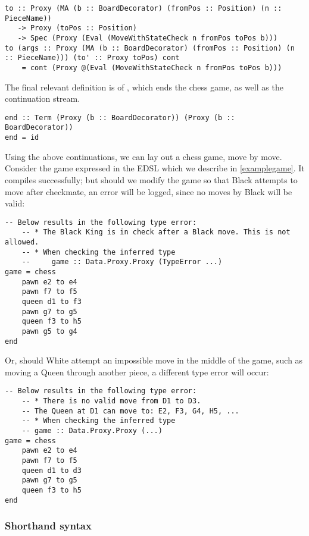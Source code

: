\begin{lstlisting}
to :: Proxy (MA (b :: BoardDecorator) (fromPos :: Position) (n :: PieceName))
   -> Proxy (toPos :: Position)
   -> Spec (Proxy (Eval (MoveWithStateCheck n fromPos toPos b)))
to (args :: Proxy (MA (b :: BoardDecorator) (fromPos :: Position) (n :: PieceName))) (to' :: Proxy toPos) cont
    = cont (Proxy @(Eval (MoveWithStateCheck n fromPos toPos b)))
\end{lstlisting}

The final relevant definition is of , which ends the chess game, as well as the continuation stream.

\begin{lstlisting}
end :: Term (Proxy (b :: BoardDecorator)) (Proxy (b :: BoardDecorator))
end = id
\end{lstlisting}

Using the above continuations, we can lay out a chess game, move by move. Consider the game expressed in the EDSL which we describe in \cref{examplegame}. It compiles successfully; but should we modify the game so that Black attempts to move after checkmate, an error will be logged, since no moves by Black will be valid:

\begin{lstlisting}
-- Below results in the following type error:
    -- * The Black King is in check after a Black move. This is not allowed.
    -- * When checking the inferred type
    --     game :: Data.Proxy.Proxy (TypeError ...)
game = chess
    pawn e2 to e4
    pawn f7 to f5
    queen d1 to f3
    pawn g7 to g5
    queen f3 to h5
    pawn g5 to g4
end
\end{lstlisting}

Or, should White attempt an impossible move in the middle of the game, such as moving a Queen through another piece, a different type error will occur:

\begin{lstlisting}
-- Below results in the following type error:
    -- * There is no valid move from D1 to D3.
    -- The Queen at D1 can move to: E2, F3, G4, H5, ...
    -- * When checking the inferred type
    -- game :: Data.Proxy.Proxy (...)
game = chess
    pawn e2 to e4
    pawn f7 to f5
    queen d1 to d3
    pawn g7 to g5
    queen f3 to h5
end
\end{lstlisting}

\subsubsection{Shorthand syntax} \label{shorthandexplanation}

